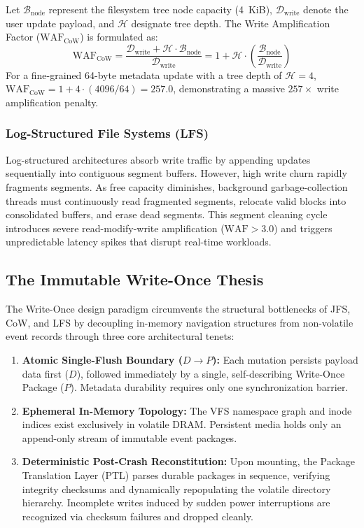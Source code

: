\documentclass[conference]{IEEEtran}
\begin{document}
Let $\mathcal{B}_{\text{node}}$ represent the filesystem tree node capacity (4~KiB), $\mathcal{D}_{\text{write}}$ denote the user update payload, and $\mathcal{H}$ designate tree depth. The Write Amplification Factor ($\text{WAF}_{\text{CoW}}$) is formulated as:
\begin{equation}
    \text{WAF}_{\text{CoW}} = \frac{\mathcal{D}_{\text{write}} + \mathcal{H} \cdot \mathcal{B}_{\text{node}}}{\mathcal{D}_{\text{write}}} = 1 + \mathcal{H} \cdot \left(\frac{\mathcal{B}_{\text{node}}}{\mathcal{D}_{\text{write}}}\right)
\end{equation}
For a fine-grained 64-byte metadata update with a tree depth of $\mathcal{H}=4$, $\text{WAF}_{\text{CoW}} = 1 + 4 \cdot (4096 / 64) = 257.0$, demonstrating a massive $257\times$ write amplification penalty.

\subsubsection{Log-Structured File Systems (LFS)}
Log-structured architectures absorb write traffic by appending updates sequentially into contiguous segment buffers. However, high write churn rapidly fragments segments. As free capacity diminishes, background garbage-collection threads must continuously read fragmented segments, relocate valid blocks into consolidated buffers, and erase dead segments. This segment cleaning cycle introduces severe read-modify-write amplification ($\text{WAF} > 3.0$) and triggers unpredictable latency spikes that disrupt real-time workloads.

\subsection{The Immutable Write-Once Thesis}
The Write-Once design paradigm circumvents the structural bottlenecks of JFS, CoW, and LFS by decoupling in-memory navigation structures from non-volatile event records through three core architectural tenets:
\begin{enumerate}
    \item \textbf{Atomic Single-Flush Boundary ($D \rightarrow P$):} Each mutation persists payload data first ($D$), followed immediately by a single, self-describing Write-Once Package ($P$). Metadata durability requires only one synchronization barrier.
    \item \textbf{Ephemeral In-Memory Topology:} The VFS namespace graph and inode indices exist exclusively in volatile DRAM. Persistent media holds only an append-only stream of immutable event packages.
    \item \textbf{Deterministic Post-Crash Reconstitution:} Upon mounting, the Package Translation Layer (PTL) parses durable packages in sequence, verifying integrity checksums and dynamically repopulating the volatile directory hierarchy. Incomplete writes induced by sudden power interruptions are recognized via checksum failures and dropped cleanly.
\end{enumerate}
\end{document}
